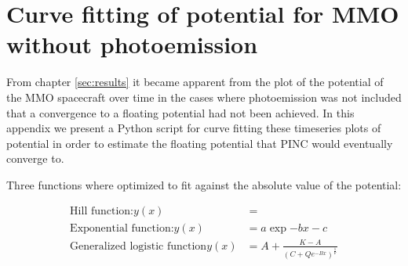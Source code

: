 \chapter{Curve fitting of potential for MMO without photoemission}
\label{sec:second-app}
\newenvironment{longlisting}{\captionsetup{type=listing}}{}

From chapter \cref{sec:results} it became apparent from the plot of the potential of the MMO spacecraft over time in the cases where photoemission was not included that a convergence to a floating potential had not been achieved. In this appendix we present a Python script for curve fitting these timeseries plots of potential in order to estimate the floating potential that PINC would eventually converge to.


Three functions where optimized to fit against the absolute value of the potential:

\begin{subequations}
    \begin{align}
        \text{Hill function:} y(x) &= \frac{}{}\label{eq:Hill} \\
        \text{Exponential function:} y(x) &= a \exp{-b x} - c \label{eq:expFit} \\
        \text{Generalized logistic function} y(x) &=  A + \frac{K - A}{\left(C + Q e^{-B x}\right)^{\frac{1}{\nu}}}
    \end{align}
\end{subequations}


